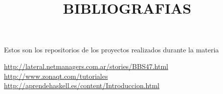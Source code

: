 \documentclass[12pt]{extbook}
\begin{document}
Estos son los repositorios de los proyectos realizados durante la materia

\begin{center}
\title{BIBLIOGRAFIAS}\maketitle
\end{center}

\href{http://lateral.netmanagers.com.ar/stories/BBS47.html}{http://lateral.netmanagers.com.ar/stories/BBS47.html}\\
\href{http://www.zonaqt.com/tutoriales}{http://www.zonaqt.com/tutoriales}\\
\href{http://aprendehaskell.es/content/Introduccion.html}{http://aprendehaskell.es/content/Introduccion.html}
\end{document}
